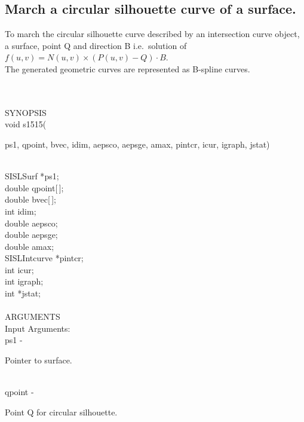 \subsection{March a circular silhouette curve of a surface.}
\begin{minipg1}
  To march the circular silhouette curve described by an intersection
  curve object, a surface, point Q and direction B
  i.e.\ solution of  $f(u,v)=N(u,v)\times (P(u,v)-Q)\cdot B$.\\
  The generated geometric curves are represented as B-spline curves.
\end{minipg1}\\ \\
SYNOPSIS\\
        \>void s1515(\begin{minipg3}
          {\fov ps1},  {\fov qpoint},  {\fov bvec},  {\fov idim},  {\fov aepsco},  {\fov aepsge},  {\fov amax},  {\fov pintcr},  {\fov icur},  {\fov igraph},  {\fov jstat})
        \end{minipg3}\\[0.3ex]
        \>\>    SISLSurf \> *{\fov ps1};\\
        \>\>    double   \> {\fov qpoint}[\,];\\
        \>\>    double   \> {\fov bvec}[\,];\\
        \>\>    int      \> {\fov idim};\\
        \>\>    double   \> {\fov aepsco};\\
        \>\>    double   \> {\fov aepsge};\\
        \>\>    double   \> {\fov amax};\\
        \>\>    SISLIntcurve \> *{\fov pintcr};\\
        \>\>    int      \> {\fov icur};\\
        \>\>    int      \> {\fov igraph};\\
        \>\>    int      \> *{\fov jstat};\\
\\
ARGUMENTS\\
        \>Input Arguments:\\
        \>\>    {\fov ps1}\> - \>  \begin{minipg2}
                     Pointer to surface.
                               \end{minipg2}\\
        \>\>    {\fov qpoint}\> - \>  \begin{minipg2}
                     Point Q for circular silhouette.
                               \end{minipg2}\\
